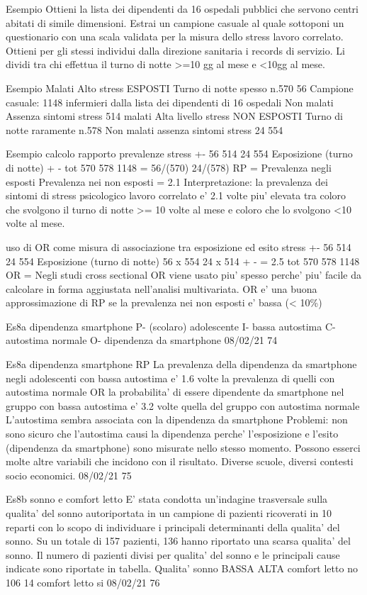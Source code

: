 \documentclass[]{book}
\begin{document}
Esempio
Ottieni la lista dei dipendenti da 16 ospedali pubblici che servono centri abitati di simile dimensioni.
Estrai un campione casuale al quale sottoponi un questionario con una scala validata per la misura dello stress lavoro correlato.
Ottieni per gli stessi individui dalla direzione sanitaria i records di servizio.
Li dividi tra chi effettua il turno di notte \textgreater{}=10 gg al mese e \textless{}10gg al mese.

Esempio
Malati Alto stress
ESPOSTI Turno di notte spesso
n.570
56
Campione casuale: 1148 infermieri dalla lista dei dipendenti di 16 ospedali
Non malati Assenza sintomi stress
514
malati Alta livello stress
NON ESPOSTI
Turno di notte raramente n.578
Non malati assenza sintomi stress
24
554

Esempio calcolo rapporto prevalenze
stress +-
56
514
24
554
Esposizione (turno di notte)
+ -
tot
570
578
1148
= 56/(570) 24/(578)
RP =
Prevalenza negli esposti
Prevalenza nei non esposti
= 2.1
Interpretazione: la prevalenza dei sintomi di stress psicologico lavoro correlato e' 2.1 volte piu' elevata tra coloro che svolgono il turno di notte \textgreater{}= 10 volte al mese e coloro che lo svolgono \textless{}10 volte al mese.

uso di OR come misura di associazione tra esposizione ed esito
stress +-
56
514
24
554
Esposizione (turno di notte)
56 x 554 24 x 514
+ -
= 2.5
tot
570
578
1148
OR =
Negli studi cross sectional OR viene usato piu' spesso perche' piu' facile da calcolare in forma aggiustata nell'analisi multivariata.
OR e' una buona approssimazione di RP se la prevalenza nei non esposti e' bassa (\textless{} 10\%)

Es8a dipendenza smartphone
P- (scolaro) adolescente
I- bassa autostima
C- autostima normale
O- dipendenza da smartphone
08/02/21
74

Es8a dipendenza smartphone
RP
La prevalenza della dipendenza da smartphone negli adolescenti con bassa autostima e' 1.6 volte la prevalenza di quelli con autostima normale
OR
la probabilita' di essere dipendente da smartphone nel gruppo con bassa autostima e' 3.2 volte quella del gruppo con autostima normale
L'autostima sembra associata con la dipendenza da smartphone
Problemi: non sono sicuro che l'autostima causi la dipendenza perche' l'esposizione e l'esito (dipendenza da smartphone) sono misurate nello stesso momento. Possono esserci molte altre variabili che incidono con il risultato. Diverse scuole, diversi contesti socio economici.
08/02/21
75

Es8b sonno e comfort letto
E' stata condotta un'indagine trasversale sulla qualita' del sonno autoriportata in un campione di pazienti ricoverati in 10 reparti con lo scopo di individuare i principali determinanti della qualita' del sonno. Su un totale di 157 pazienti, 136 hanno riportato una scarsa qualita' del sonno. Il numero di pazienti divisi per qualita' del sonno e le principali cause indicate sono riportate in tabella.
Qualita' sonno
BASSA
ALTA
comfort letto no
106
14
comfort letto si
08/02/21
76
\end{document}
